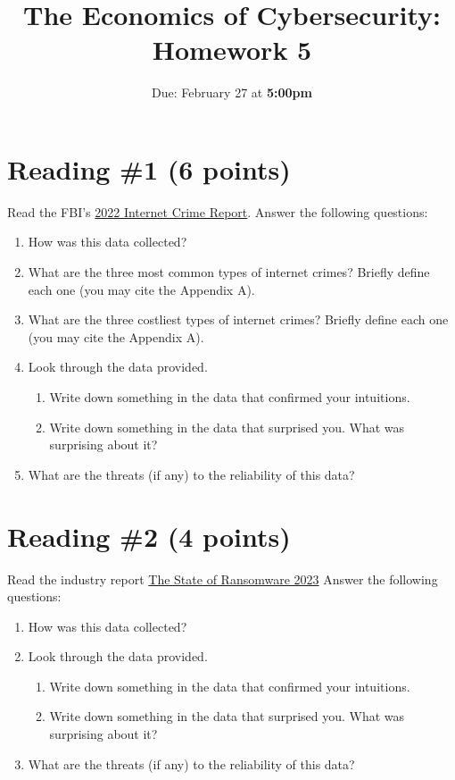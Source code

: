 \documentclass[11pt]{article}
\title{The Economics of Cybersecurity: Homework 5}
\date{Due: February 27 at {\bf 5:00pm}}
\author{}
\begin{document}
\maketitle

\section*{Reading \#1 (6 points)}

Read the FBI's \href{https://www.ic3.gov/Media/PDF/AnnualReport/2022_IC3Report.pdf}{2022 Internet Crime Report}. 
Answer the following questions:
\begin{enumerate}
    \item How was this data collected?
    \item What are the three most common types of internet crimes? Briefly define each one (you may cite the Appendix A).
    \item What are the three costliest types of internet crimes? Briefly define each one (you may cite the Appendix A).
    \item Look through the data provided.
    \begin{enumerate}
        \item Write down something in the data that confirmed your intuitions.
        \item Write down something in the data that surprised you. What was surprising about it?
    \end{enumerate}
    \item What are the threats (if any) to the reliability of this data?
\end{enumerate}


\section*{Reading \#2 (4 points)}

Read the industry report \href{https://assets.sophos.com/X24WTUEQ/at/c949g7693gsnjh9rb9gr8/sophos-state-of-ransomware-2023-wp.pdf}{The State of Ransomware 2023}
Answer the following questions:
\begin{enumerate}
    \item How was this data collected?
    \item Look through the data provided.
    \begin{enumerate}
        \item Write down something in the data that confirmed your intuitions.
        \item Write down something in the data that surprised you. What was surprising about it?
    \end{enumerate}
    \item What are the threats (if any) to the reliability of this data?
\end{enumerate}
\end{document}
